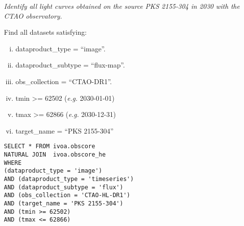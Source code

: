 {\em Identify all light curves obtained on the source PKS 2155-304 in 2030 with the CTAO observatory.\/}

\medskip
\noindent Find all datasets satisfying:
\begin{enumerate}[(i)]
  \item dataproduct\_type = ``image''.
  \item dataproduct\_subtype = ``flux-map''.
  \item obs\_collection = ``CTAO-DR1''.
  \item tmin >= 62502 ({\em e.g.\/} 2030-01-01) 
  \item tmax >= 62866 ({\em e.g.\/} 2030-12-31) 
  \item target\_name = ``PKS 2155-304''
\end{enumerate}

\begin{verbatim}
SELECT * FROM ivoa.obscore
NATURAL JOIN  ivoa.obscore_he 
WHERE
(dataproduct_type = 'image')
AND (dataproduct_type = 'timeseries')
AND (dataproduct_subtype = 'flux')
AND (obs_collection = 'CTAO-HL-DR1')
AND (target_name = 'PKS 2155-304')
AND (tmin >= 62502)
AND (tmax <= 62866)
\end{verbatim}

